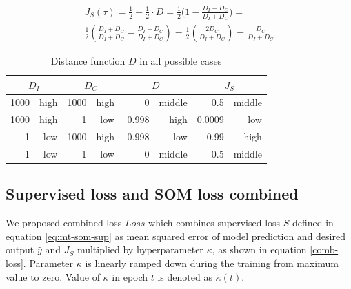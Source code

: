 \begin{equation}\label{rescale-som-loss}
\begin{split}
J_S(\tau) = \frac{1}{2}  - \frac{1}{2} \cdot D = \frac{1}{2}\Biggl(1 - \frac{D_I - D_C}{D_I + D_C}\Biggr) = \\[20pt]  
\frac{1}{2}(\frac{D_I + D_C}{D_I + D_C} - \frac{D_I - D_C}{D_I + D_C}) = 
\frac{1}{2}(\frac{2D_C}{D_I + D_C}) = \frac{D_C}{D_I + D_C}
\end{split}
\end{equation}


\begin{table}[ht]
    \centering
    \begin{tabular}{|rr|rr|rr|rr|}
    \hline
    \multicolumn{2}{|c|}{$D_I$}            & \multicolumn{2}{c|}{$D_C$}            & \multicolumn{2}{c|}{$D$}                & \multicolumn{2}{c|}{$J_S$}                \\ \hline
    
    \multicolumn{1}{|r|}{1000} & high & \multicolumn{1}{r|}{1000} & high & \multicolumn{1}{r|}{0}      & middle & \multicolumn{1}{r|}{0.5}    & middle \\ \hline
    
    \multicolumn{1}{|r|}{1000} & high & \multicolumn{1}{r|}{1}    & low  & \multicolumn{1}{r|}{0.998}  & high   & \multicolumn{1}{r|}{0.0009} & low    \\ \hline
    \multicolumn{1}{|r|}{1}    & low  & \multicolumn{1}{r|}{1000} & high & \multicolumn{1}{r|}{-0.998} & low    & \multicolumn{1}{r|}{0.99}   & high   \\ \hline
    \multicolumn{1}{|r|}{1}    & low  & \multicolumn{1}{r|}{1}    & low  & \multicolumn{1}{r|}{0}      & middle & \multicolumn{1}{r|}{0.5}    & middle \\ \hline
    \end{tabular}
    \caption{Distance function $D$ in all possible cases}
    \label{tab-dists}
\end{table}

\subsection{Supervised loss and SOM loss combined}
We proposed combined loss $Loss$ which combines supervised loss $S$ defined in equation \ref{eq:mt-som-sup} as mean squared error of model prediction and desired output $\hat{y}$ and $J_S$ multiplied by hyperparameter $\kappa$, as shown in equation \ref{comb-loss}.
Parameter $\kappa$ is linearly ramped down during the training from maximum value to zero. Value of $\kappa$ in epoch $t$ is denoted as $\kappa(t)$.

